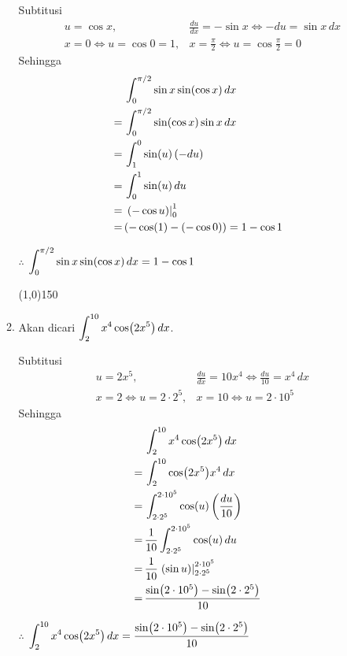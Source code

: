 \begin{enumerate}[leftmargin=*, label={\arabic*}.]
\begin{enumerate}[label={\alph*}.]
    Subtitusi
    \begin{align*}
        &u = \cos x,&\frac{du}{dx} = -\sin x \iff -du = \sin x\,dx\\
        &x=0 \iff u = \cos 0 = 1,&x=\frac{\pi}{2} \iff u = \cos \frac{\pi}{2} = 0
    \end{align*}
    Sehingga 
    \begin{align*}
        &\int_{0}^{\pi/2} \sin x\sin(\cos x)\,dx\\
        =\,& \int_{0}^{\pi/2} \sin(\cos x)\sin x\,dx\\
        =\,& \int_{1}^{0} \sin(u)\,(-du)\\
        =\,& \int_{0}^{1} \sin(u)\,du\\
        =\,& \eval{-\cos u}{0}{1}\\
        =\,& \brk*{-\cos(1)-(-\cos 0)} = 1-\cos 1
    \end{align*}
    
    $\therefore$ $\displaystyle \int_{0}^{\pi/2} \sin x\sin(\cos x)\,dx = 1-\cos 1$


\begin{center}\line(1,0){150}\end{center}


    \item Akan dicari $\ds \int_{2}^{10} x^{4}\cos\brk*{2x^{5}}\,dx$.
    
    Subtitusi
    \begin{align*}
        &u = 2x^{5},&\frac{du}{dx} = 10x^{4} \iff \frac{du}{10} = x^{4}\,dx\\
        &x=2 \iff u = 2\cdot2^{5},&x=10 \iff u = 2\cdot10^{5}
    \end{align*}
    Sehingga 
    \begin{align*}
        &\int_{2}^{10} x^{4}\cos\brk*{2x^{5}}\,dx\\
        =\,& \int_{2}^{10} \cos\brk*{2x^{5}}x^{4}\,dx\\
        =\,& \int_{2\cdot2^{5}}^{2\cdot10^{5}} \cos(u)\,\brk*{\frac{du}{10}}\\
        =\,& \frac{1}{10}\int_{2\cdot2^{5}}^{2\cdot10^{5}} \cos(u)\,du\\
        =\,& \frac{1}{10}\eval{\sin u}{2\cdot2^{5}}{2\cdot10^{5}}\\
        =\,& \frac{\sin \brk*{2\cdot10^{5}}-\sin \brk*{2\cdot2^{5}}}{10}
    \end{align*}

    $\therefore$ $\ds \int_{2}^{10} x^{4}\cos\brk*{2x^{5}}\,dx
    =\frac{\sin \brk*{2\cdot10^{5}}-\sin \brk*{2\cdot2^{5}}}{10}$


\end{enumerate}
\end{enumerate}
